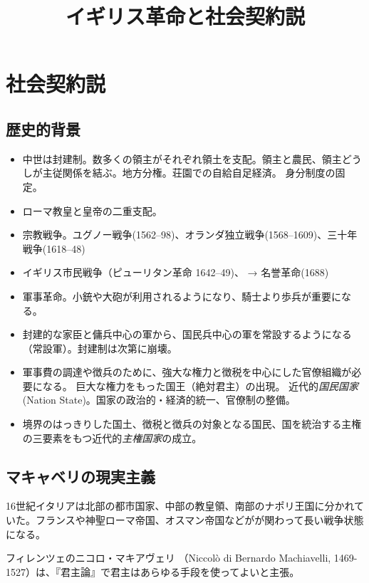 \documentclass[uplatex,dvipdfmx]{jsarticle} \usepackage{mystyle}%
\title{イギリス革命と社会契約説}
\begin{document}
\maketitle
\else\chapter{社会契約説}
\fi


\label{cha:contractarian}

\section{歴史的背景}
\begin{itemize}
\item 中世は封建制。数多くの領主がそれぞれ領土を支配。領主と農民、領主どうしが主従関係を結ぶ。地方分権。荘園での自給自足経済。 身分制度の固定。
\item ローマ教皇と皇帝の二重支配。
\item 宗教戦争。ユグノー戦争(1562--98)、オランダ独立戦争(1568--1609)、三十年戦争(1618--48)
 \item イギリス市民戦争（ピューリタン革命 1642--49)、 → 名誉革命(1688)
\item 軍事革命。小銃や大砲が利用されるようになり、騎士より歩兵が重要になる。
\item 封建的な家臣と傭兵中心の軍から、国民兵中心の軍を常設するようになる（常設軍）。封建制は次第に崩壊。
\item 軍事費の調達や徴兵のために、強大な権力と徴税を中心にした官僚組織が必要になる。
巨大な権力をもった国王（絶対君主）の出現。  近代的\emph{国民国家}(Nation State)。国家の政治的・経済的統一、官僚制の整備。
\item 境界のはっきりした国土、徴税と徴兵の対象となる国民、国を統治する主権の三要素をもつ近代的\emph{主権国家}の成立。

\end{itemize}



\section{マキャベリの現実主義}

16世紀イタリアは北部の都市国家、中部の教皇領、南部のナポリ王国に分かれていた。フランスや神聖ローマ帝国、オスマン帝国などがが関わって長い戦争状態になる。

フィレンツェのニコロ・マキアヴェリ （Niccol{\`o} di Bernardo Machiavelli, 1469-1527）は、『君主論』で君主はあらゆる手段を使ってよいと主張。
\end{document}
